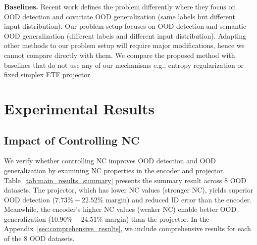 \noindent
\textbf{Baselines.}
Recent work defines the problem differently where they focus on OOD detection and covariate OOD generalization (same labels but different input distribution). Our problem setup focuses on OOD detection and semantic OOD generalization (different labels and different input distribution). Adapting other methods to our problem setup will require major modifications, hence we cannot compare directly with them. 
We compare the proposed method with baselines that do not use any of our mechanisms e.g., entropy regularization or fixed simplex ETF projector.




\section{Experimental Results}
\label{sec:exp_results}


\subsection{Impact of Controlling NC}



We verify whether controlling NC improves OOD detection and OOD generalization by examining NC properties in the encoder and projector. Table~\ref{tab:main_results_summary} presents the summary result across 8 OOD datasets. The projector, which has lower NC values (stronger NC), yields superior OOD detection ($7.73\% - 22.52\%$ margin) and reduced ID error than the encoder. Meanwhile, the encoder’s higher NC values (weaker NC) enable better OOD generalization ($10.90\% - 24.51\%$ margin) than the projector. In the Appendix~\ref{sec:comprehensive_results}, we include comprehensive results for each of the 8 OOD datasets.

